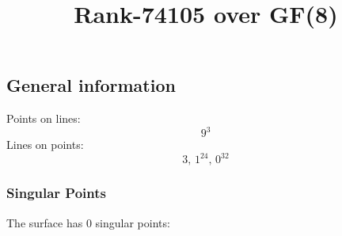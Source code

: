 \documentclass{article}
\newcommand\setTBstruts{\def\T{\rule{0pt}{2.6ex}}%
\def\B{\rule[-1.2ex]{0pt}{0pt}}}
\begin{document}
 
\setTBstruts



{\allowdisplaybreaks%






\title{Rank-74105 over GF(8)}
\author{}%
\maketitle%
%
{}



\subsection*{General information}
Points on lines:
$$
9^3$$
Lines on points:
$$
3,\,1^{24},\,0^{32}$$
\subsubsection*{Singular Points}
The surface has 0 singular points:\\
\begin{align*}
\end{align*}
}
\end{document}
